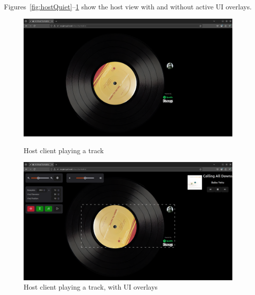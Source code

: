             Figures~\ref{fig:hostQuiet}–\ref{fig:hostGui} show the host view with and without active UI overlays.
    
            \begin{figure}[h]
                \centering
                \begin{minipage}[b]{0.45\textwidth}
                    \centering
                    \includegraphics[width=\textwidth]{images/screenshots/HOST_Quiet.png}
                    \caption{Host client playing a track}
                    \label{fig:hostQuiet}
                \end{minipage}
                \hfill
                \begin{minipage}[b]{0.45\textwidth}
                    \centering
                    \includegraphics[width=\textwidth]{images/screenshots/HOST_GUI.png}
                    \caption{Host client playing a track, with UI overlays}
                    \label{fig:hostGui}
                \end{minipage}
            \end{figure}
    
